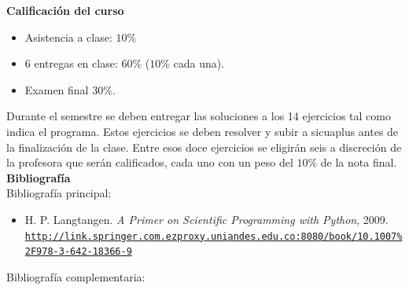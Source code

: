 \documentclass[letterpaper,10pt,onecolumn]{article}
\begin{document}
\noindent\textbf{\large {} \quad Calificaci\'on del curso}\\[-0.2cm]

\begin{itemize}
        \item Asistencia a clase: $10\%$
	\item 6 entregas en clase: $60\%$ ($10\%$ cada una).
	\item Examen final $30\%$.
\end{itemize}
\noindent\normalsize Durante el semestre se deben entregar 
las soluciones a los 14 ejercicios tal como indica el programa. 
Estos ejercicios se deben resolver y subir a sicuaplus antes de la
finalizaci\'on de la clase. 
Entre esos doce ejercicios se 
eligirán seis a discreci\'on de la profesora que serán calificados, cada uno con un peso del $10\%$ de la nota final. 
\\[0.1cm] 

\noindent\textbf{\large {} \quad Bibliografía}\\[-0.2cm]

\noindent\normalsize Bibliografía principal:


\begin{itemize}
	\item H. P. Langtangen. \textit{A Primer on Scientific Programming with Python}, 2009.\\
	\href{http://link.springer.com.ezproxy.uniandes.edu.co:8080/book/10.1007\%2F978-3-642-18366-9}{\nolinkurl{http://link.springer.com.ezproxy.uniandes.edu.co:8080/book/10.1007\%2F978-3-642-18366-9}}\\[-0.6cm]
\end{itemize}

\noindent\normalsize Bibliografía complementaria:
\end{document}
